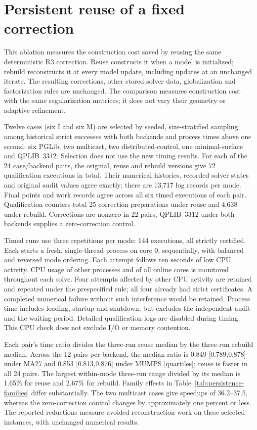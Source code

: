 \documentclass[pdflatex,sn-mathphys-num]{sn-jnl}
\theoremstyle{thmstyleone}
\theoremstyle{thmstylethree}
\begin{document}
\section{Persistent reuse of a fixed correction}\label{supp:persistence}
This ablation measures the construction cost saved by reusing the same
deterministic R3 correction. Reuse constructs it when a model is initialized; rebuild reconstructs it
at every model update, including updates at an unchanged iterate. The resulting corrections, other stored solver data,
globalization and factorization rules are unchanged. The comparison measures
construction cost with the same regularization matrices; it does not vary
their geometry or adaptive refinement.

Twelve cases (six I and six M) are selected by seeded, size-stratified
sampling among historical strict successes with both backends and process
times above one second: six PGLib, two multicast, two distributed-control,
one minimal-surface and QPLIB~3312. Selection does not use the new timing results. For each of the 24 case/backend pairs, the original, reuse and rebuild
versions give 72 qualification executions in total. Their numerical histories, recorded solver states and original
audit values agree exactly; there are 13,717 log records per mode. Final
points and work records agree across all six timed executions of each pair.
Qualification counters total 25 correction preparations under reuse and
4,638 under rebuild. Corrections are nonzero in 22 pairs; QPLIB~3312 under
both backends supplies a zero-correction control.

Timed runs use three repetitions per mode: 144 executions, all
strictly certified. Each starts a fresh, single-thread process on core 0,
sequentially, with balanced and reversed mode ordering. Each attempt follows
ten seconds of low CPU activity. CPU usage of other processes and of all
online cores is monitored throughout each solve. Four attempts affected by
other CPU activity are retained and repeated under the prespecified rule;
all four already had strict certificates. A completed numerical failure
without such interference would be retained. Process time includes
loading, startup and shutdown, but excludes the independent audit and
the waiting period. Detailed qualification logs are disabled during timing. This CPU
check does not exclude I/O or memory contention.

Each pair's time ratio divides the three-run reuse median by the three-run
rebuild median. Across the 12 pairs per backend, the median ratio is
0.849 [0.789,0.878] under MA27 and 0.853 [0.813,0.876] under MUMPS
[quartiles]; reuse is faster in all 24 pairs. The largest within-mode
three-run range divided by its median is 1.65\% for reuse and 2.67\% for
rebuild. Family effects in Table~\ref{tab:persistence-families} differ
substantially. The two multicast cases give speedups of 36.2--37.5,
whereas the zero-correction control changes by approximately one percent
or less. The reported reductions measure avoided reconstruction work on these
selected instances, with unchanged numerical results.
\end{document}
